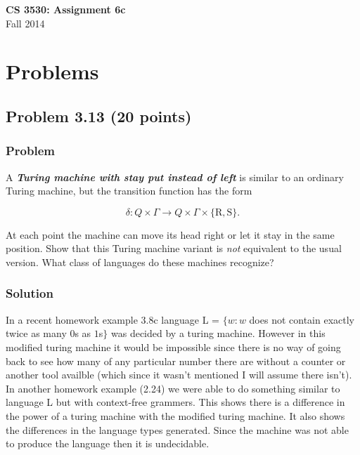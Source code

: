 \documentclass{article}
\begin{document}
\begin{center}
\textbf{\Large CS 3530: Assignment 6c} \\[2mm]
Fall 2014
\end{center}

\raggedright

\section*{Problems}

\subsection*{Problem 3.13 (20 points)}

\subsubsection*{Problem}

A \textit{\textbf{Turing machine with stay put instead of left}} is
similar to an ordinary Turing machine, but the transition function
has the form

$$ \delta: Q\times\Gamma\rightarrow
Q\times\Gamma\times\{\text{R},\text{S}\}. $$

At each point the machine can move its head right or let it stay in
the same position. Show that this Turing machine variant is
\textit{not} equivalent to the usual version. What class of
languages do these machines recognize?

\subsubsection*{Solution}

In a recent homework example 3.8c language L = 
$\{w:w$ does not contain exactly twice as many $0$s as $1$s$\}$
was decided by a turing machine. However in this modified turing machine it would be impossible since there is no way of going back to see how many of any particular number there are without a counter or another tool availble (which since it wasn't mentioned I will assume there isn't). In another homework example (2.24) we were able to do something similar to language L but with context-free grammers. This shows there is a difference in the power of a turing machine with the modified turing machine. It also shows the differences in the language types generated. Since the machine was not able to produce the language then it is undecidable.
\end{document}
